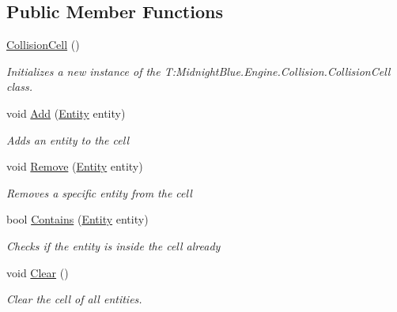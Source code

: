 \subsection*{Public Member Functions}
\begin{DoxyCompactItemize}
\item 
\hyperlink{class_midnight_blue_1_1_engine_1_1_collision_1_1_collision_cell_a72b70e1bf34972fcddc6433eee2cd75a}{Collision\+Cell} ()
\begin{DoxyCompactList}\small\item\em Initializes a new instance of the T\+:\+Midnight\+Blue.\+Engine.\+Collision.\+Collision\+Cell class. \end{DoxyCompactList}\item 
void \hyperlink{class_midnight_blue_1_1_engine_1_1_collision_1_1_collision_cell_a6e7c40d82371e32cb18c5fb93e645dc8}{Add} (\hyperlink{class_midnight_blue_1_1_engine_1_1_entity_component_1_1_entity}{Entity} entity)
\begin{DoxyCompactList}\small\item\em Adds an entity to the cell \end{DoxyCompactList}\item 
void \hyperlink{class_midnight_blue_1_1_engine_1_1_collision_1_1_collision_cell_acaf2c0f24b2854d5f02ea2a3c20d0d04}{Remove} (\hyperlink{class_midnight_blue_1_1_engine_1_1_entity_component_1_1_entity}{Entity} entity)
\begin{DoxyCompactList}\small\item\em Removes a specific entity from the cell \end{DoxyCompactList}\item 
bool \hyperlink{class_midnight_blue_1_1_engine_1_1_collision_1_1_collision_cell_aafba8ca6c6fd79c297abb3e7590c269f}{Contains} (\hyperlink{class_midnight_blue_1_1_engine_1_1_entity_component_1_1_entity}{Entity} entity)
\begin{DoxyCompactList}\small\item\em Checks if the entity is inside the cell already \end{DoxyCompactList}\item 
void \hyperlink{class_midnight_blue_1_1_engine_1_1_collision_1_1_collision_cell_ac4bfd3cfb6886ecf2d9553901516030d}{Clear} ()
\begin{DoxyCompactList}\small\item\em Clear the cell of all entities. \end{DoxyCompactList}\end{DoxyCompactItemize}
